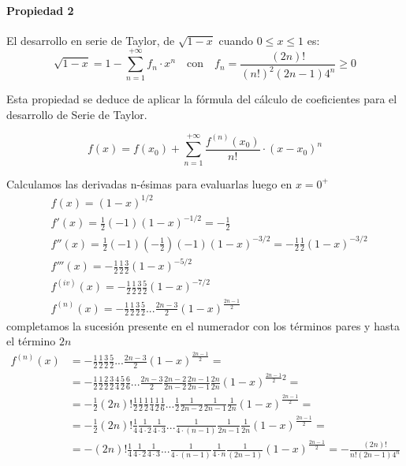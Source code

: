 \paragraph{Propiedad 2} El desarrollo en serie de Taylor, de $\sqrt{1-x}$ cuando $0 \leq x \leq 1$ es:
\begin{equation}
    \sqrt{1-x}= 1-\sum_{n=1}^{+\infty} f_n \cdot x^n \quad \text{con} \quad f_n = \frac{(2n)!}{(n!)^2 (2n-1) 4^n} \geq 0
    \label{eqn:taylorraiz}
\end{equation}

Esta propiedad se deduce de aplicar la fórmula del cálculo de coeficientes para el desarrollo de Serie de Taylor.

\begin{equation*}
    f(x) = f(x_0) + \sum_{n=1}^{+\infty} \frac{f^{(n)}(x_0)}{n!} \cdot (x-x_0)^n
\end{equation*}

Calculamos las derivadas n-ésimas para evaluarlas luego en $x=0^+$
\begin{align*}
    &f(x) = (1-x)^{1/2}\\
    &f'(x) = \frac{1}{2} (-1) (1-x)^{-1/2} = - \frac{1}{2}\\
    &f''(x) = \frac{1}{2} (-1) (-\frac{1}{2})(-1) (1-x)^{-3/2} = -\frac{1}{2} \frac{1}{2} (1-x)^{-3/2} \\
    &f'''(x) = -\frac{1}{2} \frac{1}{2} \frac{3}{2} (1-x)^{-5/2} \\
    &f^{(iv)}(x) = -\frac{1}{2} \frac{1}{2} \frac{3}{2} \frac{5}{2}  (1-x)^{-7/2} \\
    &f^{(n)}(x) = -\frac{1}{2} \frac{1}{2} \frac{3}{2} \frac{5}{2} ... \frac{2n-3}{2} (1-x)^{\frac{2n-1}{2}}
\end{align*}
completamos la sucesión presente en el numerador con los términos pares y hasta el término $2n$
\begin{align*}
    f^{(n)}(x) &= -\frac{1}{2} \frac{1}{2} \frac{3}{2} \frac{5}{2} ... \frac{2n-3}{2} (1-x)^{\frac{2n-1}{2}} = \\
      &= -\frac{1}{2} \frac{1}{2} \frac{2}{2} \frac{3}{2} \frac{4}{4} \frac{5}{2} \frac{6}{6} ... \frac{2n-3}{2} \frac{2n-2}{2n-2} \frac{2n-1}{2n-1} \frac{2n}{2n} (1-x)^{\frac{2n-1}{2}2} = \\
        &= -\frac{1}{2} (2n)!  \frac{1}{2} \frac{1}{2} \frac{1}{2} \frac{1}{4} \frac{1}{2} \frac{1}{6} ... \frac{1}{2} \frac{1}{2n-2} \frac{1}{2n-1} \frac{1}{2n} (1-x)^{\frac{2n-1}{2}} =\\
      &= -\frac{1}{2} (2n)!   \frac{1}{4}   \frac{1}{4\cdot2} \frac{1}{4\cdot3} ... \frac{1}{4\cdot(n-1)} \frac{1}{2n-1} \frac{1}{2n} (1-x)^{\frac{2n-1}{2}} =\\        
            &= - (2n)!    \frac{1}{4}   \frac{1}{4\cdot2} \frac{1}{4\cdot3} ... \frac{1}{4\cdot(n-1)} \frac{1}{4\cdot n} \frac{1}{(2n-1)} (1-x)^{\frac{2n-1}{2}} = - \frac{(2n)!}{n! (2n-1) 4^n}
\end{align*}

